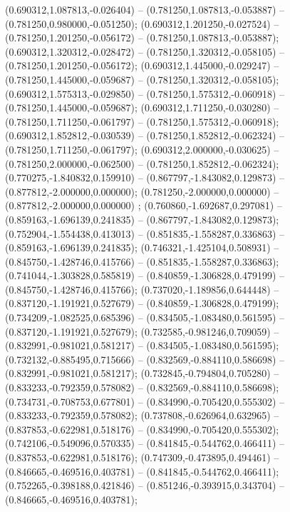  (0.690312,1.087813,-0.026404) -- (0.781250,1.087813,-0.053887) -- (0.781250,0.980000,-0.051250);
 (0.690312,1.201250,-0.027524) -- (0.781250,1.201250,-0.056172) -- (0.781250,1.087813,-0.053887);
 (0.690312,1.320312,-0.028472) -- (0.781250,1.320312,-0.058105) -- (0.781250,1.201250,-0.056172);
 (0.690312,1.445000,-0.029247) -- (0.781250,1.445000,-0.059687) -- (0.781250,1.320312,-0.058105);
 (0.690312,1.575313,-0.029850) -- (0.781250,1.575312,-0.060918) -- (0.781250,1.445000,-0.059687);
 (0.690312,1.711250,-0.030280) -- (0.781250,1.711250,-0.061797) -- (0.781250,1.575312,-0.060918);
 (0.690312,1.852812,-0.030539) -- (0.781250,1.852812,-0.062324) -- (0.781250,1.711250,-0.061797);
 (0.690312,2.000000,-0.030625) -- (0.781250,2.000000,-0.062500) -- (0.781250,1.852812,-0.062324);
 (0.770275,-1.840832,0.159910) -- (0.867797,-1.843082,0.129873) -- (0.877812,-2.000000,0.000000);
 (0.781250,-2.000000,0.000000) -- (0.877812,-2.000000,0.000000) ;
 (0.760860,-1.692687,0.297081) -- (0.859163,-1.696139,0.241835) -- (0.867797,-1.843082,0.129873);
 (0.752904,-1.554438,0.413013) -- (0.851835,-1.558287,0.336863) -- (0.859163,-1.696139,0.241835);
 (0.746321,-1.425104,0.508931) -- (0.845750,-1.428746,0.415766) -- (0.851835,-1.558287,0.336863);
 (0.741044,-1.303828,0.585819) -- (0.840859,-1.306828,0.479199) -- (0.845750,-1.428746,0.415766);
 (0.737020,-1.189856,0.644448) -- (0.837120,-1.191921,0.527679) -- (0.840859,-1.306828,0.479199);
 (0.734209,-1.082525,0.685396) -- (0.834505,-1.083480,0.561595) -- (0.837120,-1.191921,0.527679);
 (0.732585,-0.981246,0.709059) -- (0.832991,-0.981021,0.581217) -- (0.834505,-1.083480,0.561595);
 (0.732132,-0.885495,0.715666) -- (0.832569,-0.884110,0.586698) -- (0.832991,-0.981021,0.581217);
 (0.732845,-0.794804,0.705280) -- (0.833233,-0.792359,0.578082) -- (0.832569,-0.884110,0.586698);
 (0.734731,-0.708753,0.677801) -- (0.834990,-0.705420,0.555302) -- (0.833233,-0.792359,0.578082);
 (0.737808,-0.626964,0.632965) -- (0.837853,-0.622981,0.518176) -- (0.834990,-0.705420,0.555302);
 (0.742106,-0.549096,0.570335) -- (0.841845,-0.544762,0.466411) -- (0.837853,-0.622981,0.518176);
 (0.747309,-0.473895,0.494461) -- (0.846665,-0.469516,0.403781) -- (0.841845,-0.544762,0.466411);
 (0.752265,-0.398188,0.421846) -- (0.851246,-0.393915,0.343704) -- (0.846665,-0.469516,0.403781);
